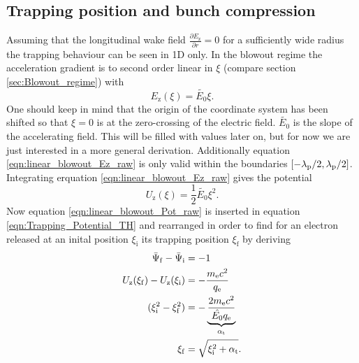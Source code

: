 \subsection{Trapping position and bunch compression}
Assuming that the longitudinal wake field 
$\frac{\partial E_\mathrm{z}}{\partial r} = 0 $ for a sufficiently wide radius the trapping behaviour can be seen in 1D only.
In the blowout regime the acceleration gradient is to second order linear in $\xi$ (compare section \ref{sec:Blowout_regime}) with
\begin{equation}
\label{eqn:linear_blowout_Ez_raw}
E_\mathrm{z}(\xi)=\tilde{E_0}\xi.
\end{equation}
One should keep in mind that the origin of the coordinate system has been shifted so that $\xi=0$ is at the zero-crossing of the electric field. $\tilde{E_0}$ is the slope of the accelerating field. This will be filled with values later on, but for now we are just interested in a more general derivation. Additionally equation \ref{eqn:linear_blowout_Ez_raw} is only valid within the boundaries $[-\lambda_\mathrm{p}/2,\lambda_\mathrm{p}/2]$.
Integrating erquation \ref{eqn:linear_blowout_Ez_raw} gives the potential
\begin{equation}
\label{eqn:linear_blowout_Pot_raw}
U_\mathrm{z}(\xi)=\frac{1}{2}\tilde{E_0}\xi^2.
\end{equation}
Now equation \ref{eqn:linear_blowout_Pot_raw} is inserted in equation \ref{eqn:Trapping_Potential_TH} and rearranged in order to find for an electron released at an inital position $\xi_\mathrm{i}$ its trapping position $\xi_\mathrm{f}$ by deriving
\begin{align}
\bar{\Psi}_\mathrm{f}-\bar{\Psi}_\mathrm{i}&=-1\\
U_\mathrm{z}(\xi_\mathrm{f})-U_\mathrm{z}(\xi_\mathrm{i})&=-\frac{m_\mathrm{e} c^2}{q_\mathrm{e}}\\
(\xi_\mathrm{i}^2-\xi_\mathrm{f}^2)&=-\underbrace{\frac{2m_\mathrm{e} c^2}{\hat{E_0}q_\mathrm{e}}}_{\alpha_\mathrm{t}}\\
\label{eqn:Trapping_Position}
\xi_\mathrm{f}&=\sqrt{\xi_\mathrm{i}^2+\alpha_\mathrm{t}}.
\end{align}

